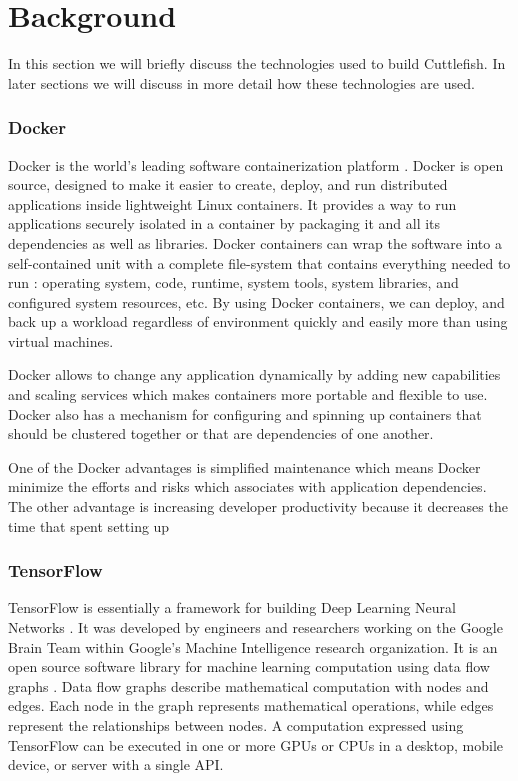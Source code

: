 \documentclass[conference]{IEEEtran}
\begin{document}
\section{Background}
In this section we will briefly discuss the technologies used to build Cuttlefish. In later sections we will discuss in more detail how these technologies are used.\\

\subsubsection{Docker}
Docker is the world's leading software containerization platform \cite{what-docker}. Docker is open source, designed to make it easier to create, deploy, and run distributed applications inside lightweight Linux containers. It provides a way to run applications securely isolated in a container by packaging it and all its dependencies as well as libraries. Docker containers can wrap the software into a self-contained unit with a complete file-system that contains everything needed to run \cite{ben-use-docker}: operating system, code, runtime, system tools, system libraries, and configured system resources, etc. By using Docker containers, we can deploy, and back up a workload regardless of environment quickly and easily more than using virtual machines.

Docker allows to change any application dynamically by adding new capabilities and scaling services which makes containers more portable and flexible to use. Docker also has a mechanism for configuring and spinning up containers that should be clustered together or that are dependencies of one another.

One of the Docker advantages is simplified maintenance which means Docker minimize the efforts and risks which associates with application dependencies. The other advantage is increasing developer productivity because it decreases the time that spent setting up 

\subsubsection{TensorFlow}
TensorFlow is essentially a framework for building Deep Learning Neural Networks \cite{tensor-home}. It was developed by engineers and researchers working on the Google Brain Team within Google's Machine Intelligence research organization. It is an open source software library for machine learning computation using data flow graphs \cite{tensor-home}. Data flow graphs describe mathematical computation with nodes and edges. Each node in the graph represents mathematical operations, while edges represent the relationships between nodes. A computation expressed using TensorFlow can be executed in one or more GPUs or CPUs in a desktop, mobile device, or server with a single API.
\end{document}
